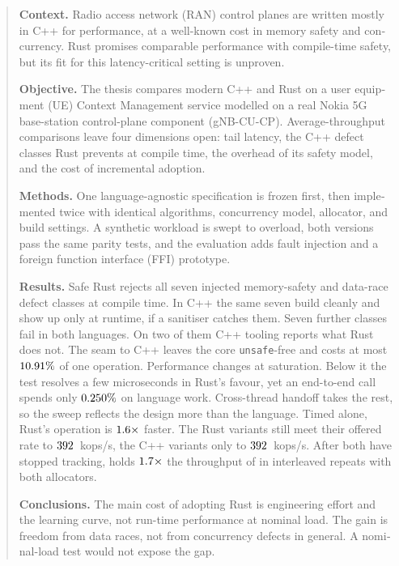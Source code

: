 \documentclass[english,oneside,a4paper,censored,csm,software-track-2020]{HYthesisML}
\begin{document}
{\singlespacing
\begin{otherlanguage}{english}
\begin{abstract}
\noindent\textbf{Context.}
Radio access network (RAN) control planes are written mostly in C++ for performance, at a
well-known cost in memory safety and concurrency. Rust promises comparable performance with
compile-time safety, but its fit for this latency-critical setting is unproven.

\noindent\textbf{Objective.}
The thesis compares modern C++ and Rust on a user equipment (UE) Context Management service
modelled on a real Nokia 5G base-station control-plane component (gNB-CU-CP).
Average-throughput comparisons leave four dimensions open: tail latency, the C++ defect classes Rust prevents at compile time, the overhead of
its safety model, and the cost of incremental adoption.

\noindent\textbf{Methods.}
One language-agnostic specification is frozen first, then implemented twice with identical
algorithms, concurrency model, allocator, and build settings. A synthetic workload is swept to
overload, both versions pass the same parity tests, and the evaluation adds fault injection and a
foreign function interface (FFI) prototype.

\noindent\textbf{Results.}
Safe Rust rejects all seven injected memory-safety and data-race defect classes at compile
time. In C++ the same seven build cleanly and show up only at runtime, if a sanitiser catches
them. Seven further classes fail in both languages. On two of them C++ tooling reports what
Rust does not. The seam to C++ leaves the core \texttt{unsafe}-free and costs at most
$\FfiOpBoundPct\%$ of one operation. Performance changes at saturation. Below it the test resolves a few microseconds in Rust's favour, yet an end-to-end call spends only $\BudgetCoreShareMax\%$ on language
work. Cross-thread handoff takes the rest, so the sweep reflects the design more than the
language. Timed alone, Rust's operation is $\BudgetCoreRatio\times$ faster. The Rust variants still meet their offered rate to $\TrackingLoadRust$~kops/s, the C++ variants only to $\TrackingLoadCpp$~kops/s. After both have stopped tracking, \OverloadSustainedFaster{} holds
$\OverloadThrRatio\times$ the throughput of \OverloadSustainedSlower{} in \OverloadThrAgree{}
interleaved repeats with both allocators.

\noindent\textbf{Conclusions.}
The main cost of adopting Rust is engineering effort and the learning curve, not run-time
performance at nominal load. The gain is freedom from data races, not from concurrency
defects in general. A nominal-load test would not expose the gap.
\end{abstract}
\end{otherlanguage}
}
\end{document}
